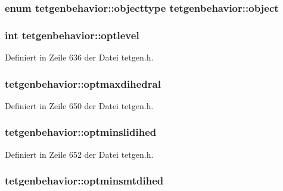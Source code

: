 \hypertarget{classtetgenbehavior_ae01337ff20025a815a4f2e4d8c3d2871}{
\subsubsection[{object}]{\setlength{\rightskip}{0pt plus 5cm}enum {\bf tetgenbehavior\-::objecttype}  tetgenbehavior\-::object}}\label{classtetgenbehavior_ae01337ff20025a815a4f2e4d8c3d2871}
\hypertarget{classtetgenbehavior_ae6d1777b2e5f9dad3921c778fc735717}{
\subsubsection[{optlevel}]{\setlength{\rightskip}{0pt plus 5cm}int tetgenbehavior\-::optlevel}}\label{classtetgenbehavior_ae6d1777b2e5f9dad3921c778fc735717}


Definiert in Zeile 636 der Datei tetgen.\-h.

\hypertarget{classtetgenbehavior_a191cab44548550697e3d672c9966c61b}{
\subsubsection[{optmaxdihedral}]{ tetgenbehavior\-::optmaxdihedral}}\label{classtetgenbehavior_a191cab44548550697e3d672c9966c61b}


Definiert in Zeile 650 der Datei tetgen.\-h.

\hypertarget{classtetgenbehavior_a7298676875d7609798023ec2df17ccb9}{
\subsubsection[{optminslidihed}]{ tetgenbehavior\-::optminslidihed}}\label{classtetgenbehavior_a7298676875d7609798023ec2df17ccb9}


Definiert in Zeile 652 der Datei tetgen.\-h.

\hypertarget{classtetgenbehavior_a3f4246164c85bd2d1f88ed4e9c739398}{
\subsubsection[{optminsmtdihed}]{ tetgenbehavior\-::optminsmtdihed}}\label{classtetgenbehavior_a3f4246164c85bd2d1f88ed4e9c739398}


